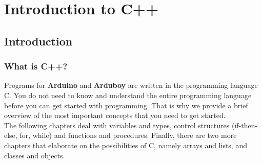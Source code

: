 \documentclass[11pt,fleqn]{book} %
\def\Cpp{{C\nolinebreak[4]\hspace{-.05em}\raisebox{.4ex}{\tiny\bf ++}}}
\begin{document}



\pagestyle{empty} %

\tableofcontents %

\cleardoublepage %

\pagestyle{fancy} %


\part{Introduction to C++}
\chapter{Introduction}
\section{What is C++?}
Programs for \textbf{Arduino} and \textbf{Arduboy} are written in the programming language \Cpp\index{C++@\Cpp}. You do not need to know and understand the entire programming language before you can get started with programming. That is why we provide a brief overview of the most important concepts that you need to get started.\\

\noindent The following chapters deal with variables and types, control structures (if-then-else, for, while) and functions and procedures. Finally, there are two more chapters that elaborate on the possibilities of \Cpp, namely arrays and lists, and classes and objects.\\
\end{document}
